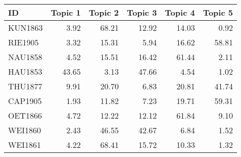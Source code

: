 \begin{tabular}{lrrrrr}
\toprule
     ID &  Topic 1 &  Topic 2 &  Topic 3 &  Topic 4 &  Topic 5 \\
\midrule
KUN1863 &     3.92 &    68.21 &    12.92 &    14.03 &     0.92 \\
RIE1905 &     3.32 &    15.31 &     5.94 &    16.62 &    58.81 \\
NAU1858 &     4.52 &    15.51 &    16.42 &    61.44 &     2.11 \\
HAU1853 &    43.65 &     3.13 &    47.66 &     4.54 &     1.02 \\
THU1877 &     9.91 &    20.70 &     6.83 &    20.81 &    41.74 \\
CAP1905 &     1.93 &    11.82 &     7.23 &    19.71 &    59.31 \\
OET1866 &     4.72 &    12.22 &    12.12 &    61.84 &     9.10 \\
WEI1860 &     2.43 &    46.55 &    42.67 &     6.84 &     1.52 \\
WEI1861 &     4.22 &    68.41 &    15.72 &    10.33 &     1.32 \\
\bottomrule
\end{tabular}
